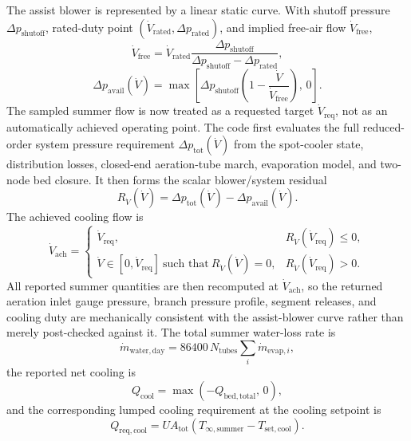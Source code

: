 \documentclass[11pt]{article}
\begin{document}
The assist blower is represented by a linear static curve. With shutoff pressure \(\Delta p_{\mathrm{shutoff}}\), rated-duty point \((\dot V_{\mathrm{rated}},\Delta p_{\mathrm{rated}})\), and implied free-air flow \(\dot V_{\mathrm{free}}\),
\begin{equation}
\label{eq:assist_blower_free_air}
\dot V_{\mathrm{free}}=
\dot V_{\mathrm{rated}}
\frac{\Delta p_{\mathrm{shutoff}}}{\Delta p_{\mathrm{shutoff}}-\Delta p_{\mathrm{rated}}},
\end{equation}
\begin{equation}
\label{eq:assist_blower_linear_curve}
\Delta p_{\mathrm{avail}}(\dot V)=
\max\!\left[
\Delta p_{\mathrm{shutoff}}
\left(1-\frac{\dot V}{\dot V_{\mathrm{free}}}\right),\,0
\right].
\end{equation}
The sampled summer flow is now treated as a requested target \(\dot V_{\mathrm{req}}\), not as an automatically achieved operating point. The code first evaluates the full reduced-order system pressure requirement \(\Delta p_{\mathrm{tot}}(\dot V)\) from the spot-cooler state, distribution losses, closed-end aeration-tube march, evaporation model, and two-node bed closure. It then forms the scalar blower/system residual
\begin{equation}
\label{eq:summer_blower_flow_residual}
R_{\dot V}(\dot V)=\Delta p_{\mathrm{tot}}(\dot V)-\Delta p_{\mathrm{avail}}(\dot V).
\end{equation}
The achieved cooling flow is
\begin{equation}
\label{eq:summer_blower_achieved_flow}
\dot V_{\mathrm{ach}}=
\begin{cases}
\dot V_{\mathrm{req}}, & R_{\dot V}(\dot V_{\mathrm{req}})\le 0,\\[4pt]
\dot V\in[0,\dot V_{\mathrm{req}}]\ \text{such that}\ R_{\dot V}(\dot V)=0, & R_{\dot V}(\dot V_{\mathrm{req}})>0.
\end{cases}
\end{equation}
All reported summer quantities are then recomputed at \(\dot V_{\mathrm{ach}}\), so the returned aeration inlet gauge pressure, branch pressure profile, segment releases, and cooling duty are mechanically consistent with the assist-blower curve rather than merely post-checked against it.
The total summer water-loss rate is
\begin{equation}
\label{eq:summer_water_loss_day}
\dot m_{\mathrm{water,day}}=
86400\,N_{\mathrm{tubes}}\sum_i \dot m_{\mathrm{evap},i},
\end{equation}
the reported net cooling is
\begin{equation}
\label{eq:summer_cooling_capacity}
Q_{\mathrm{cool}}=\max\!\left(-Q_{\mathrm{bed,total}},\,0\right),
\end{equation}
and the corresponding lumped cooling requirement at the cooling setpoint is
\begin{equation}
\label{eq:summer_required_cooling}
Q_{\mathrm{req,cool}}=UA_{\mathrm{tot}}\left(T_{\infty,\mathrm{summer}}-T_{\mathrm{set,cool}}\right).
\end{equation}
\end{document}
